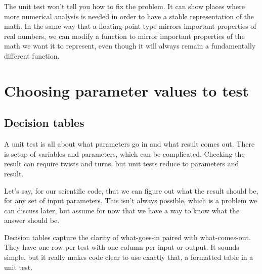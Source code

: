 \documentclass[fleqn,10pt]{olplainarticle}
\begin{document}
The unit test won't tell you how to fix the problem.
It can show places where more numerical analysis is
needed in order to have a stable representation of the math.
In the same way that a floating-point type mirrors important
properties of real numbers, we can modify a function to
mirror important properties of the math we want it to represent,
even though it will always remain a fundamentally different function.


\section{Choosing parameter values to test}\label{sec:parameter-logic}

\subsection{Decision tables}\label{sec:parameter-decision}

A unit test is all about what parameters go in and what result
comes out. There is setup of variables and
parameters, which can be complicated. Checking the result can
require twists and turns, but unit tests reduce to parameters and
result.

Let's say, for our scientific code, that we can figure out what the result
should be, for any set of input parameters. This isn't always
possible, which is a problem we can discuss later, but assume
for now that we have a way to know what the answer should be.

Decision tables capture the clarity of what-goes-in paired
with what-comes-out. They have one row per test with one
column per input or output. It sounds simple, but it
really makes code clear to use exactly that, a formatted
table in a unit test.
\end{document}
